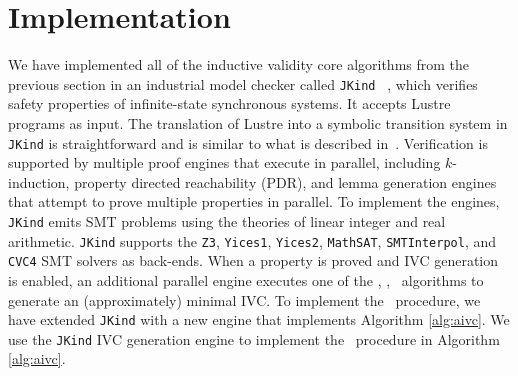 \section{Implementation}
\label{sec:impl}

We have implemented all of the inductive validity core algorithms from the previous section in an industrial model checker called \texttt{JKind} ~\cite{jkind},
which verifies safety properties of infinite-state synchronous systems.
It accepts Lustre programs \cite{Halbwachs91:lustre} as input.  The translation of Lustre
into a symbolic transition system in \texttt{JKind} is straightforward and is similar to what is described
in~\cite{Hagen08:FMCAD}.
Verification is supported by multiple proof engines that execute in parallel, including $k$-induction,
property directed reachability (PDR), and lemma generation engines that attempt to prove
multiple properties in parallel.  To implement the engines,
\texttt{JKind} emits SMT problems using the theories of linear integer and real arithmetic.  \texttt{JKind} supports the
\texttt{Z3}, \texttt{Yices1}, \texttt{Yices2}, \texttt{MathSAT}, \texttt{SMTInterpol}, and \texttt{CVC4} SMT solvers as back-ends.  When a property is
proved and IVC generation is enabled, an additional parallel engine
executes one of the {\ucalg, \bfalg, \ucbfalg}~algorithms \cite{Ghass16} to generate an (approximately) minimal IVC.
%
To implement the \aivcalg\ procedure, we have extended \texttt{JKind} with a new engine that implements Algorithm \ref{alg:aivc}.
We use the \texttt{JKind} IVC generation engine to implement the \getivc\ procedure in  Algorithm \ref{alg:aivc}.

